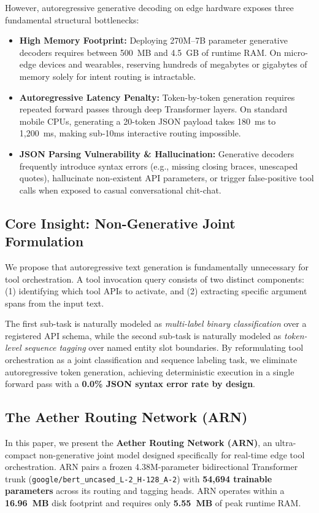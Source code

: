 \documentclass[letterpaper]{article} %
\begin{document}
However, autoregressive generative decoding on edge hardware exposes three fundamental structural bottlenecks:
\begin{itemize}
    \item \textbf{High Memory Footprint:} Deploying 270M--7B parameter generative decoders requires between 500~MB and 4.5~GB of runtime RAM. On micro-edge devices and wearables, reserving hundreds of megabytes or gigabytes of memory solely for intent routing is intractable.
    \item \textbf{Autoregressive Latency Penalty:} Token-by-token generation requires repeated forward passes through deep Transformer layers. On standard mobile CPUs, generating a 20-token JSON payload takes 180~ms to 1,200~ms, making sub-10ms interactive routing impossible.
    \item \textbf{JSON Parsing Vulnerability \& Hallucination:} Generative decoders frequently introduce syntax errors (e.g., missing closing braces, unescaped quotes), hallucinate non-existent API parameters, or trigger false-positive tool calls when exposed to casual conversational chit-chat.
\end{itemize}

\subsection{Core Insight: Non-Generative Joint Formulation}

We propose that autoregressive text generation is fundamentally unnecessary for tool orchestration. A tool invocation query consists of two distinct components: (1) identifying which tool APIs to activate, and (2) extracting specific argument spans from the input text. 

The first sub-task is naturally modeled as \emph{multi-label binary classification} over a registered API schema, while the second sub-task is naturally modeled as \emph{token-level sequence tagging} over named entity slot boundaries. By reformulating tool orchestration as a joint classification and sequence labeling task, we eliminate autoregressive token generation, achieving deterministic execution in a single forward pass with a \textbf{0.0\% JSON syntax error rate by design}.

\subsection{The Aether Routing Network (ARN)}

In this paper, we present the \textbf{Aether Routing Network (ARN)}, an ultra-compact non-generative joint model designed specifically for real-time edge tool orchestration. ARN pairs a frozen 4.38M-parameter bidirectional Transformer trunk (\texttt{google/bert\_uncased\_L-2\_H-128\_A-2}) with \textbf{54,694 trainable parameters} across its routing and tagging heads. ARN operates within a \textbf{16.96~MB} disk footprint and requires only \textbf{5.55~MB} of peak runtime RAM.
\end{document}
